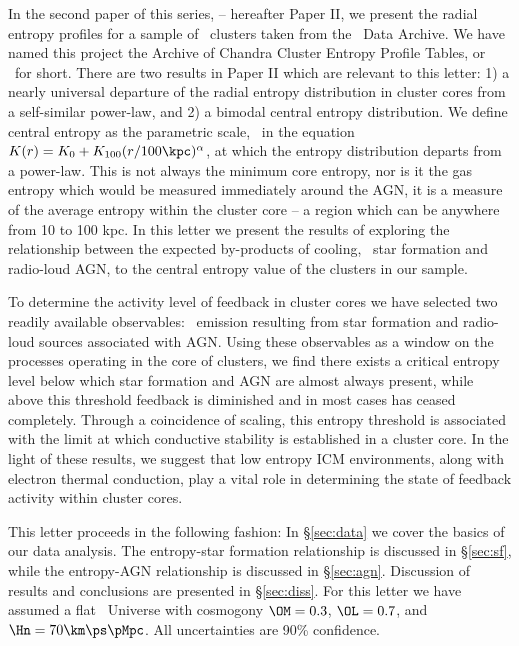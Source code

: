 \documentclass{emulateapj}
\begin{document}
In the second paper of this series, \cite{accept2} -- hereafter Paper
II, we present the radial entropy profiles for a sample of \clnum\
clusters taken from the \Chandra\ Data Archive. We have named this
project the Archive of Chandra Cluster Entropy Profile Tables, or
\accept\ for short. There are two results in Paper II which are
relevant to this letter: 1) a nearly universal departure of the radial
entropy distribution in cluster cores from a self-similar power-law,
and 2) a bimodal central entropy distribution.  We define central
entropy as the parametric scale, \kna\ in the equation $K(r) = K_0
+K_{100}(r/100 \kpc)^{\alpha}$, at which the entropy distribution
departs from a power-law. This is not always the minimum core entropy,
nor is it the gas entropy which would be measured immediately around
the AGN, it is a measure of the average entropy within the cluster
core -- a region which can be anywhere from 10 to 100 kpc. In this
letter we present the results of exploring the relationship between
the expected by-products of cooling, \eg\ star formation and
radio-loud AGN, to the central entropy value of the clusters in our
sample.

To determine the activity level of feedback in cluster cores we have
selected two readily available observables: \halpha\ emission
resulting from star formation and radio-loud sources associated with
AGN. Using these observables as a window on the processes operating in
the core of clusters, we find there exists a critical entropy level
below which star formation and AGN are almost always present, while
above this threshold feedback is diminished and in most cases has
ceased completely. Through a coincidence of scaling, this entropy
threshold is associated with the limit at which conductive stability
is established in a cluster core.  In the light of these results, we
suggest that low entropy ICM environments, along with electron thermal
conduction, play a vital role in determining the state of feedback
activity within cluster cores.

This letter proceeds in the following fashion: In \S\ref{sec:data} we
cover the basics of our data analysis. The entropy-star formation
relationship is discussed in \S\ref{sec:sf}, while the entropy-AGN
relationship is discussed in \S\ref{sec:agn}. Discussion of results
and conclusions are presented in \S\ref{sec:diss}.  For this letter we
have assumed a flat \LCDM\ Universe with cosmogony $\OM=0.3$,
$\OL=0.7$, and $\Hn=70\km\ps\pMpc$. All uncertainties are 90\%
confidence.
\end{document}
